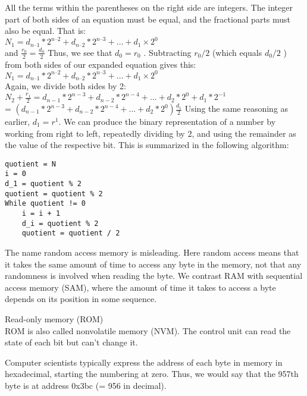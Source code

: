 \documentclass[12pt]{extarticle}
\begin{document}
\vspace{8pt}
All the terms within the parentheses on the right side are integers. The integer part of both
sides of an equation must be equal, and the fractional parts must also be equal. That is:\\
$ N_1 = d_{n–1} * 2^{n–2} + d_{n–2} * 2^{n–3} + … + d_1 × 2^0$ \\
and $\frac{r_0}{2} = \frac{d_0}{2}$ \newline \newline
Thus, we see that $ d_0 = r_0 $ . Subtracting $r_0 / 2$ (which equals $d_0 / 2$ ) from
both sides of our expanded equation gives this: \\
$ N_1 = d_{n–1} * 2^{n–2} + d_{n–2} * 2^{n–3} + … + d_1 × 2^0 $ \\
Again, we divide both sides by 2: \newline\newline
$N_2  + \frac{r_1}{2}  = d_{n-1} * 2^{n-3} + d_{n-2} * 2^{n-4} + ... + d_2 * 2^0 + d_1 * 2^{-1}$ \\
= $(d_{n-1}  * 2^{n-3} + d_{n-2} * 2^{n-4} + ... + d_2 * 2^0 ) \frac{d_1}{2}$ \newline\newline
Using the same reasoning as earlier, $d_1 = r^1$. We can produce the binary
representation of a number by working from right to left, repeatedly dividing by 2, and using
the remainder as the value of the respective bit. This is summarized in the following algorithm: \\

\begin{lstlisting}
quotient = N
i = 0
d_1 = quotient % 2
quotient = quotient % 2
While quotient != 0
    i = i + 1
    d_i = quotient % 2
    quotient = quotient / 2
\end{lstlisting}

The name random access memory is misleading. Here random access means that it takes the
same amount of time to access any byte in the memory, not that any randomness is involved 
when reading the byte. We contrast RAM with sequential access memory (SAM), where the amount
of time it takes to access a byte depends on its position in some sequence.

\vspace{10pt}
\Large{Read-only memory (ROM)}\\
ROM is also called nonvolatile memory (NVM). The control unit can read
the state of each bit but can’t change it.

\vspace{10pt}
Computer scientists typically express the address of each byte in memory in hexadecimal, starting
the numbering at zero. Thus, we would say that the 957th byte is at address 0x3bc (= 956 in decimal).
\end{document}
